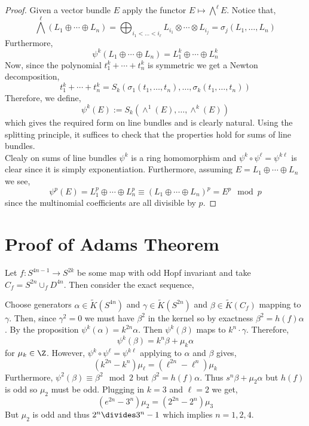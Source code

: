 \documentclass[12pt]{extarticle}
\begin{document}
\begin{proof}
Given a vector bundle $E$ apply the functor $E \mapsto \bigwedge^\ell E$. Notice that,
\[ \bigwedge^\ell (L_1 \oplus \cdots \oplus L_n) = \bigoplus_{i_1 < \dots < i_\ell} L_{i_1} \otimes \cdots \otimes L_{i_j} = \sigma_j(L_1, \dots, L_n) \]
Furthermore, 
\[ \psi^k(L_1 \oplus \cdots \oplus L_n) = L_1^k \oplus \cdots \oplus L^k_n \]
Now, since the polynomial $t_1^k + \cdots + t_n^k$ is symmetric we get a Newton decomposition,
\[ t_1^k + \cdots + t^k_n = S_k(\sigma_1(t_1, \dots, t_n), \dots, \sigma_k(t_1, \dots, t_n)) \]
Therefore, we define,
\[ \psi^k(E) := S_k(\wedge^1(E), \dots, \wedge^k(E)) \]
which gives the required form on line bundles and is clearly natural. Using the splitting principle, it suffices to check that the properties hold for sums of line bundles. 
\bigskip\\
Clealy on sums of line bundles $\psi^k$ is a ring homomorphism and $\psi^k \circ \psi^\ell = \psi^{k \ell}$ is clear since it is simply exponentiation. Furthermore, assuming $E = L_1 \oplus \cdots \oplus L_n$ we see,
\[ \psi^p(E) = L_1^p \oplus \cdots \oplus L_n^p \equiv (L_1 \oplus \cdots \oplus L_n)^p = E^p \mod{p} \]
since the multinomial coefficients are all divisible by $p$. 
\end{proof}

\section{Proof of Adams Theorem}

Let $f : S^{4n - 1} \to S^{2k}$ be some map with odd Hopf invariant and take $C_f = S^{2n} \cup_f D^{4n}$. Then consider the exact sequence,
\begin{center}
\end{center}
Choose generators $\alpha \in \tilde{K}(S^{4n})$ and $\gamma \in \tilde{K}(S^{2n})$ and $\beta \in \tilde{K}(C_f)$ mapping to $\gamma$. Then, since $\gamma^2 = 0$ we must have $\beta^2$ in the kernel so by exactness $\beta^2 = h(f) \alpha$. By the proposition $\psi^{k}(\alpha) = k^{2n} \alpha$. Then $\psi^k(\beta)$ maps to $k^n \cdot \gamma$. Therefore,
\[ \psi^k(\beta) = k^n \beta  + \mu_k \alpha \]
for $\mu_k \in \Z$. However, $\psi^k \circ \psi^\ell = \psi^{k\ell}$ applying to $\alpha$ and $\beta$ gives,
\[ (k^{2n} - k^n) \mu_\ell = (\ell^{2n} - \ell^n) \mu_k \]
Furthermore, $\psi^2(\beta) \equiv \beta^2 \mod{2}$ but $\beta^2 = h(f) \alpha$. Thus $s^n \beta + \mu_2 \alpha$ but $h(f)$ is odd so $\mu_2$ must be odd. Plugging in $k = 3$ and $\ell = 2$ we get,
\[ (e^{2n} - 3^n) \mu_2 = (2^{2n} - 2^n) \mu_3 \]
But $\mu_2$ is odd and thus $2^n \divides 3^n - 1$ which implies $n = 1,2,4$. 
\end{document}
